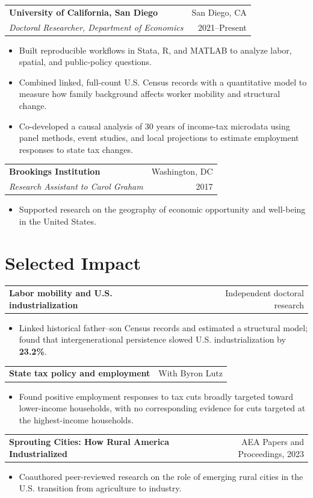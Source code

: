 \documentclass[10pt,letterpaper]{article}
\makeatletter
\newcommand{\entry}[4]{%
  \begin{tabularx}{\linewidth}{@{}Xr@{}}
    {\fontsize{10.35}{11.5}\selectfont\bfseries\color{navy}#1} &
    {\headingfont\fontsize{9.2}{10.5}\selectfont\color{slate}#2} \\
    {\fontsize{9.7}{10.8}\selectfont\itshape#3} &
    {\headingfont\fontsize{9.2}{10.5}\selectfont\color{teal}#4}
  \end{tabularx}\vspace{-1.5pt}
}
\newcommand{\project}[2]{%
  \begin{tabularx}{\linewidth}{@{}Xr@{}}
    {\bfseries\color{navy}#1} &
    {\headingfont\fontsize{9.1}{10}\selectfont\color{slate}#2}
  \end{tabularx}\vspace{-1.5pt}
}
\makeatother
\begin{document}
\vspace{2pt}
\entry{University of California, San Diego}{San Diego, CA}{Doctoral Researcher, Department of Economics}{2021--Present}
\begin{itemize}
  \item Built reproducible workflows in Stata, R, and MATLAB to analyze labor, spatial, and public-policy questions.
  \item Combined linked, full-count U.S. Census records with a quantitative model to measure how family background affects worker mobility and structural change.
  \item Co-developed a causal analysis of 30 years of income-tax microdata using panel methods, event studies, and local projections to estimate employment responses to state tax changes.
\end{itemize}

\vspace{2pt}
\entry{Brookings Institution}{Washington, DC}{Research Assistant to Carol Graham}{2017}
\begin{itemize}
  \item Supported research on the geography of economic opportunity and well-being in the United States.
\end{itemize}

\section{Selected Impact}
\project{Labor mobility and U.S. industrialization}{Independent doctoral research}
\begin{itemize}
  \item Linked historical father--son Census records and estimated a structural model; found that intergenerational persistence slowed U.S. industrialization by \textbf{23.2\%}.
\end{itemize}

\project{State tax policy and employment}{With Byron Lutz}
\begin{itemize}
  \item Found positive employment responses to tax cuts broadly targeted toward lower-income households, with no corresponding evidence for cuts targeted at the highest-income households.
\end{itemize}

\project{Sprouting Cities: How Rural America Industrialized}{AEA Papers and Proceedings, 2023}
\begin{itemize}
  \item Coauthored peer-reviewed research on the role of emerging rural cities in the U.S. transition from agriculture to industry.
\end{itemize}
\end{document}
